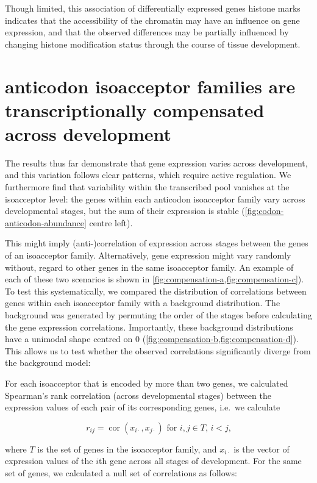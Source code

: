 Though limited, this association of differentially expressed \trna genes histone
marks indicates that the accessibility of the chromatin may have an influence on
\trna gene expression, and that the observed differences may be partially
influenced by changing histone modification status through the course of tissue
development.

\section{ anticodon isoacceptor families are transcriptionally
compensated across development}

The results thus far demonstrate that \trna gene expression varies across
development, and this variation follows clear patterns, which require active
regulation. We furthermore find that variability within the transcribed
\trna pool vanishes at the isoacceptor level: the \trna genes within each
anticodon isoacceptor family vary across developmental stages, but the sum of
their expression is stable (\cref{fig:codon-anticodon-abundance} centre left).

This might imply (anti-)correlation of expression across stages between the
genes of an isoacceptor family. Alternatively, \trna gene expression might vary
randomly without, regard to other \trna genes in the same isoacceptor family. An
example of each of these two scenarios is shown in
\cref{fig:compensation-a,fig:compensation-c}). To test this systematically, we
compared the distribution of correlations between genes within each isoacceptor
family with a background distribution. The background was generated by permuting
the order of the stages before calculating the \trna gene expression
correlations. Importantly, these background distributions have a unimodal shape
centred on \num{0} (\cref{fig:compensation-b,fig:compensation-d}). This allows
us to test whether the observed correlations significantly diverge from the
background model:

For each isoacceptor that is encoded by more than two \trna genes, we calculated
Spearman’s rank correlation (across developmental stages) between the expression
values of each pair of its corresponding \trna genes, i.e.\ we calculate

\begin{equation}
    r_{ij} = \operatorname{cor}(x_{i\cdot}, x_{j\cdot}) \text{\ for \(i, j \in
        T\), \(i < j\),}
\end{equation}

where \(T\) is the set of \trna genes in the isoacceptor family, and
\(x_{i\cdot}\) is the vector of expression values of the \(i\)th \trna gene
across all stages of development. For the same set of genes, we calculated a
null set of correlations as follows:

